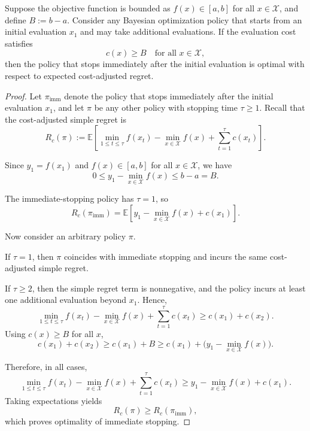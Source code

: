 \begin{proposition}
\label{prop:immediate_optimal}
Suppose the objective function is bounded as $f(x) \in [a,b]$ for all $x \in \mathcal X$, and define $B := b-a$. Consider any Bayesian optimization policy that starts from an initial evaluation $x_1$ and may take additional evaluations. If the evaluation cost satisfies
\[
c(x) \ge B \quad \text{for all } x \in \mathcal X,
\]
then the policy that stops immediately after the initial evaluation is optimal with respect to expected cost-adjusted regret.
\end{proposition}

\begin{proof}
Let $\pi_{\mathrm{imm}}$ denote the policy that stops immediately after the initial evaluation $x_1$, and let $\pi$ be any other policy with stopping time $\tau \ge 1$. Recall that the cost-adjusted simple regret is
\[
R_c(\pi)
:=
\mathbb E\!\left[
\min_{1 \le t \le \tau} f(x_t) - \min_{x \in \mathcal X} f(x)
+ \sum_{t=1}^\tau c(x_t)
\right].
\]

Since $y_1 = f(x_1)$ and $f(x) \in [a,b]$ for all $x \in \mathcal X$, we have
\[
0 \le y_1 - \min_{x \in \mathcal X} f(x) \le b-a = B.
\]

The immediate-stopping policy has $\tau=1$, so
\[
R_c(\pi_{\mathrm{imm}})
=
\mathbb E\!\left[
y_1 - \min_{x \in \mathcal X} f(x)
+ c(x_1)
\right].
\]

Now consider an arbitrary policy $\pi$.

If $\tau = 1$, then $\pi$ coincides with immediate stopping and incurs the same cost-adjusted simple regret.

If $\tau \ge 2$, then the simple regret term is nonnegative, and the policy incurs at least one additional evaluation beyond $x_1$. Hence,
\[
\min_{1 \le t \le \tau} f(x_t) - \min_{x \in \mathcal X} f(x)
+ \sum_{t=1}^\tau c(x_t)
\ge
c(x_1) + c(x_2).
\]
Using $c(x) \ge B$ for all $x$,
\[
c(x_1) + c(x_2)
\ge
c(x_1) + B
\ge
c(x_1) + \bigl(y_1 - \min_{x \in \mathcal X} f(x)\bigr).
\]

Therefore, in all cases,
\[
\min_{1 \le t \le \tau} f(x_t) - \min_{x \in \mathcal X} f(x)
+ \sum_{t=1}^\tau c(x_t)
\ge
y_1 - \min_{x \in \mathcal X} f(x) + c(x_1).
\]
Taking expectations yields
\[
R_c(\pi) \ge R_c(\pi_{\mathrm{imm}}),
\]
which proves optimality of immediate stopping.
\end{proof}

